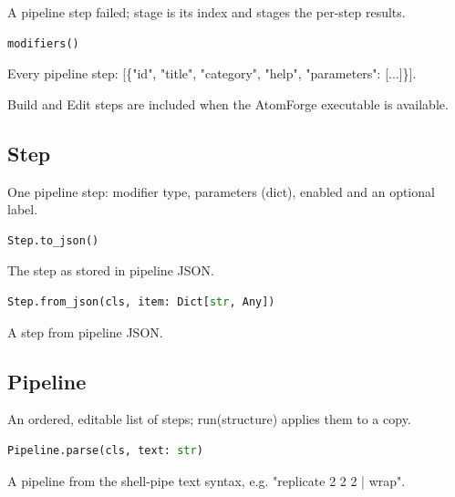 A pipeline step failed; stage is its index and stages the per-step results.

\begin{samepage}

\begin{lstlisting}[language=Python]
modifiers()
\end{lstlisting}

Every pipeline step: [\{"id", "title", "category", "help", "parameters": [...]\}].

Build and Edit steps are included when the AtomForge executable is available.

\end{samepage}



\subsection{Step}

One pipeline step: modifier type, parameters (dict), enabled and an optional label.

\begin{samepage}

\begin{lstlisting}[language=Python]
Step.to_json()
\end{lstlisting}

The step as stored in pipeline JSON.

\end{samepage}



\begin{samepage}

\begin{lstlisting}[language=Python]
Step.from_json(cls, item: Dict[str, Any])
\end{lstlisting}

A step from pipeline JSON.

\end{samepage}



\subsection{Pipeline}

An ordered, editable list of steps; run(structure) applies them to a copy.

\begin{samepage}

\begin{lstlisting}[language=Python]
Pipeline.parse(cls, text: str)
\end{lstlisting}

A pipeline from the shell-pipe text syntax, e.g. "replicate 2 2 2 | wrap".

\end{samepage}



